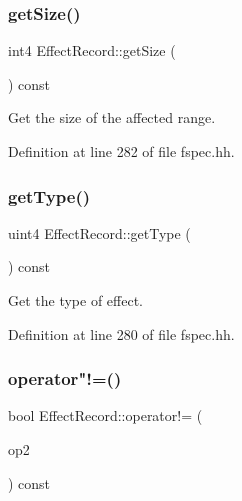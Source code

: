 \mbox{\label{class_effect_record_a30bb645ee7f1a917b62cb9adb3f5dc75}} 
\subsubsection{\texorpdfstring{getSize()}{getSize()}}
{\footnotesize\ttfamily int4 Effect\+Record\+::get\+Size (\begin{DoxyParamCaption}\item[{void}]{ }\end{DoxyParamCaption}) const\hspace{0.3cm}{\ttfamily [inline]}}



Get the size of the affected range. 



Definition at line 282 of file fspec.\+hh.

\mbox{\label{class_effect_record_a524045f2df2655c5d37c99e4297acfdf}} 
\subsubsection{\texorpdfstring{getType()}{getType()}}
{\footnotesize\ttfamily uint4 Effect\+Record\+::get\+Type (\begin{DoxyParamCaption}\item[{void}]{ }\end{DoxyParamCaption}) const\hspace{0.3cm}{\ttfamily [inline]}}



Get the type of effect. 



Definition at line 280 of file fspec.\+hh.

\mbox{\label{class_effect_record_a5291ec5070dde1ee06f3cfefb2fcc21a}} 
\subsubsection{\texorpdfstring{operator"!=()}{operator!=()}}
{\footnotesize\ttfamily bool Effect\+Record\+::operator!= (\begin{DoxyParamCaption}\item[{const \mbox{\hyperlink{class_effect_record}{Effect\+Record}} \&}]{op2 }\end{DoxyParamCaption}) const\hspace{0.3cm}{\ttfamily [inline]}}



